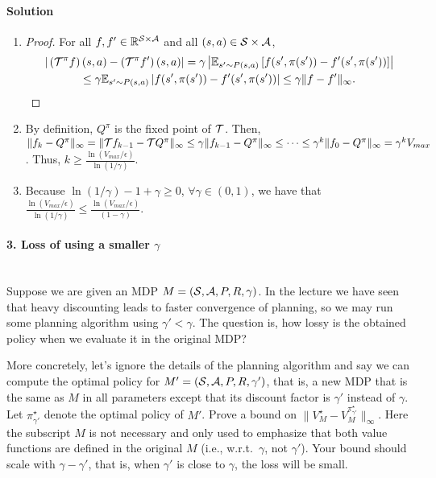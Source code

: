 \documentclass{article}
\begin{document}
\paragraph{Solution}
\begin{enumerate}
\item
\begin{proof} For all $f, f' \in \mathbb{R}^{\mathcal{S} \times \mathcal{A}}$ and all $(s,a) \in \mathcal{S} \times \mathcal{A}$,
\begin{multline*}
|\left(\mathcal{T}^\pi f\right) (s, a) - \left(\mathcal{T}^\pi f'\right) (s, a)| = \gamma \left|\mathbb{E}_{s'\sim P(s,a)} \left[f(s',\pi(s')) - f'(s',\pi(s'))\right]\right|\\ \leq \gamma \mathbb{E}_{s'\sim P(s,a)} \left|f(s',\pi(s')) - f'(s',\pi(s'))\right| \leq \gamma \|f-f'\|_{\infty}.
\end{multline*}
\end{proof}
\item By definition, $Q^\pi$ is the fixed point of $\mathcal{T}$. Then, $\|f_k - Q^\pi\|_\infty = \|\mathcal{T} f_{k-1} - \mathcal{T} Q^\pi\|_\infty \leq \gamma \|f_{k-1} - Q^\pi\|_\infty \leq \cdots \leq \gamma^k \|f_0 - Q^\pi\|_\infty = \gamma^k V_{max}$. Thus, $k \geq \frac{\ln(V_{max} / \epsilon)}{\ln(1/\gamma)}$.
\item Because $\ln(1/\gamma) - 1 + \gamma \geq 0$, $\forall \gamma \in (0,1)$, we have that $\frac{\ln(V_{max} / \epsilon)}{\ln(1/\gamma)} \leq \frac{\ln(V_{max} / \epsilon)}{(1 - \gamma)}$.
\end{enumerate}
\newpage

\paragraph{3. Loss of using a smaller $\gamma$}~\\
Suppose we are given an MDP $M = (\mathcal{S}, \mathcal{A}, P, R, \gamma)$. In the lecture we have seen that heavy discounting leads to faster convergence of planning, so we may run some planning algorithm using $\gamma' < \gamma$. The question is, how lossy is the obtained policy when we evaluate it in the original MDP? 

More concretely, let's ignore the details of the planning algorithm and say we can compute the optimal policy for $M' = (\mathcal{S}, \mathcal{A}, P, R, \gamma')$, that is, a new MDP that is the same as $M$ in all parameters except that its discount factor is $\gamma'$ instead of $\gamma$. Let $\pi_{\gamma'}^\star$ denote the optimal policy of $M'$. Prove a bound on $\|V_M^\star - V_M^{\pi_{\gamma'}^\star}\|_\infty$. Here the subscript $M$ is not necessary and only used to emphasize that both value functions are defined in the original $M$ (i.e., w.r.t.~$\gamma$, not $\gamma'$). 
Your bound should scale with $\gamma - \gamma'$, that is, when $\gamma'$ is close to $\gamma$, the loss will be small. 
\end{document}
